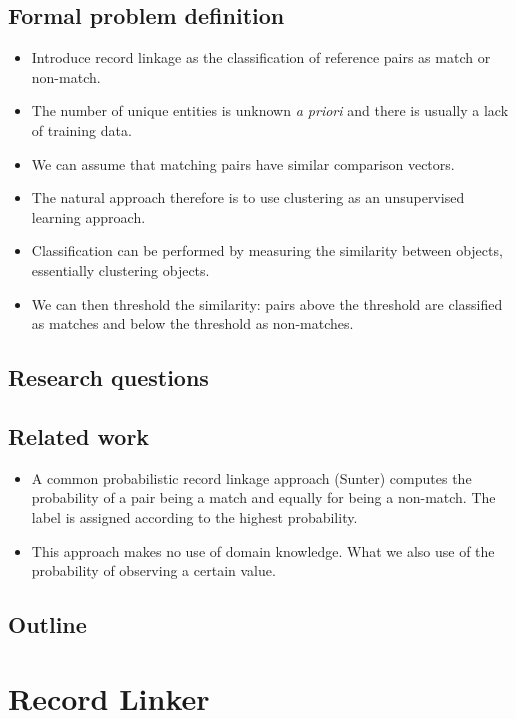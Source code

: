 \documentclass[paper=a4, fontsize=11pt]{scrartcl}
\begin{document}
\subsection{Formal problem definition}
\begin{itemize}
    \item Introduce record linkage as the classification of reference pairs as match or non-match.
    \item The number of unique entities is unknown \emph{a priori} and there is usually a lack of training data.
    \item We can assume that matching pairs have similar comparison vectors.
    \item The natural approach therefore is to use clustering as an unsupervised learning approach.
    \item Classification can be performed by measuring the similarity between objects, essentially clustering objects.
    \item We can then threshold the similarity: pairs above the threshold are classified as matches and below the threshold as non-matches.
\end{itemize}

\subsection{Research questions}

\subsection{Related work}
\begin{itemize}
    \item A common probabilistic record linkage approach (Sunter) computes the probability of a pair being a match and equally for being a non-match. The label is assigned according to the highest probability.
    \item This approach makes no use of domain knowledge. What we also use of the probability of observing a certain value.
\end{itemize}

\subsection{Outline}




\section{Record Linker}
\end{document}
